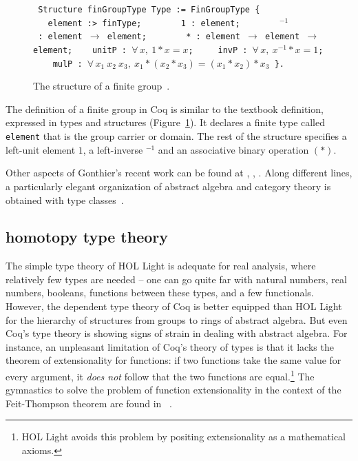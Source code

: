 \documentclass{llncs}
\begin{document}

\begin{figure}
{

\obeylines\tt
Structure~finGroupType~Type~:= FinGroupType \{
~~~element~:>~finType;
~~~~~~~1~:~element;
~~~~~~\hskip0.8mm ${}^{-1}$~:~element $\to$ element;
~~~~~~~*~:~element $\to$ element $\to$ element;
~~~unitP~:~$\forall\,x,~1*x = x$;
~~~~invP~:~$\forall\,x,~x^{-1} * x = 1$;
~~~~mulP~:~$\forall\,x_1~x_2~x_3,~ x_1 * (x_2 * x_3) = (x_1 * x_2) * x_3$
\}.

}
\caption{The structure of a finite group~\cite{gonMF}.}
\label{fig:group}
\end{figure}

The definition of a finite group in Coq is similar to the textbook definition,
expressed in types and structures (Figure~\ref{fig:group}).
It declares a finite type called {\tt element} that is the group
carrier or domain.  The rest of the structure specifies a left-unit
element $1$, a left-inverse ${}^{-1}$ and an associative binary
operation $( * )$.  

Other aspects of Gonthier's recent work can be found at
\cite{gonPFSF}, \cite{gonPMS}, \cite{gonC}.
Along different lines, a particularly elegant organization of abstract
algebra and category theory is obtained with type
classes~\cite{SpE11}.

\subsection{homotopy type theory}

The simple type theory of HOL Light is adequate for real analysis,
where relatively few types are needed -- one can go quite far with
natural numbers, real numbers, booleans, functions between these
types, and a few functionals.  However, the dependent type theory of
Coq is better equipped than HOL Light for the hierarchy of structures
from groups to rings of abstract algebra.  But even
Coq's type theory is showing signs of strain in dealing with abstract
algebra.  For instance, an unpleasant limitation of Coq's theory of
types is that it lacks the theorem of extensionality for functions: if
two functions take the same value for every argument, it {\it does
  not} follow that the two functions are equal.\footnote{HOL Light
  avoids this problem by positing extensionality as a mathematical axioms.}  The
gymnastics to solve the problem of function extensionality in the
context of the Feit-Thompson theorem are found in ~\cite{gonMF}.
\end{document}
